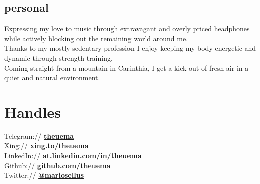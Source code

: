 \documentclass[]{resume}
\begin{document}
\begin{minipage}[t]{0.33\textwidth}
	\subsection{personal}
	Expressing my love to music through extravagant and overly priced headphones while actively blocking out the remaining world around me. \\ \sectionsep
	Thanks to my mostly sedentary profession I enjoy keeping my body energetic and dynamic through strength training. \\ \sectionsep 
	Coming straight from a mountain in Carinthia, I get a kick out of fresh air in a quiet and natural environment. 
	\sectionsep
\section{Handles} 
	Telegram:// \href{https://telegram.me/theuema}{\textbf{theuema}} \\ \smallsep 
	Xing:// \href{https://www.xing.com/profile/Mario_Theuermann}{\textbf{xing.to/theuema}} \\ \smallsep 
	LinkedIn:// \href{https://www.linkedin.com/in/theuema}{\textbf{at.linkedin.com/in/theuema}} \\ \smallsep 
	Github:// \href{https://github.com/theuema}{\textbf{github.com/theuema}} \\ \smallsep 
	Twitter:// \href{https://twitter.com/mariosellus}{\textbf{@mariosellus}} \\ \smallsep 

\end{minipage}\quad %
\end{document}
